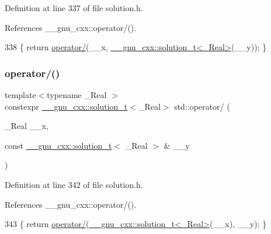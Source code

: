 Definition at line 337 of file solution.\+h.



References \+\_\+\+\_\+gnu\+\_\+cxx\+::operator/().


\begin{DoxyCode}
338     \{ \textcolor{keywordflow}{return} \hyperlink{namespacestd_a51cf4f07903a8d424249d8198c73843d}{operator/}(\_\_x, \hyperlink{namespace____gnu__cxx_ae20ea642de50eb361074c62676b0159c}{\_\_gnu\_cxx::solution\_t<\_Real>}(\_\_y)); \}
\end{DoxyCode}
\mbox{\label{namespacestd_a28e6ddaee7c29b09e84e85d2b52f5bc1}} 
\subsubsection{\texorpdfstring{operator/()}{operator/()}\hspace{0.1cm}{\footnotesize\ttfamily [3/5]}}
{\footnotesize\ttfamily template$<$typename \+\_\+\+Real $>$ \\
constexpr \hyperlink{namespace____gnu__cxx_ae20ea642de50eb361074c62676b0159c}{\+\_\+\+\_\+gnu\+\_\+cxx\+::solution\+\_\+t}$<$\+\_\+\+Real$>$ std\+::operator/ (\begin{DoxyParamCaption}\item[{\+\_\+\+Real}]{\+\_\+\+\_\+x,  }\item[{const \hyperlink{namespace____gnu__cxx_ae20ea642de50eb361074c62676b0159c}{\+\_\+\+\_\+gnu\+\_\+cxx\+::solution\+\_\+t}$<$ \+\_\+\+Real $>$ \&}]{\+\_\+\+\_\+y }\end{DoxyParamCaption})}



Definition at line 342 of file solution.\+h.



References \+\_\+\+\_\+gnu\+\_\+cxx\+::operator/().


\begin{DoxyCode}
343     \{ \textcolor{keywordflow}{return} \hyperlink{namespacestd_a51cf4f07903a8d424249d8198c73843d}{operator/}(\hyperlink{namespace____gnu__cxx_ae20ea642de50eb361074c62676b0159c}{\_\_gnu\_cxx::solution\_t<\_Real>}(\_\_x), \_\_y); \}
\end{DoxyCode}
\mbox{\label{namespacestd_a59403102f8805c3846c7fbf820e7b48a}} 
